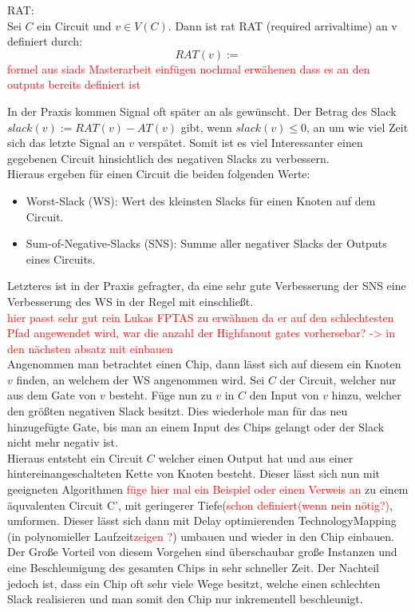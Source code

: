 \documentclass[11pt, a4paper, german]{article}
\newcommand{\TM}{TechnologyMapping }
\begin{document}
\begin{definition}{RAT:}\\
	Sei $C$ ein Circuit und $v \in V(C)$. Dann ist rat RAT (required arrivaltime) an v definiert durch:
	\[   RAT(v) :=  \] \textcolor{red}{formel aus siads Masterarbeit einfügen nochmal erwähenen dass es an den outputs bereits definiert ist}
\end{definition}

In der Praxis kommen Signal oft später an als gewünscht. Der Betrag des Slack $slack(v) := RAT(v) - AT(v)$ gibt, wenn $slack(v) \leq 0 $, an um wie viel Zeit sich das letzte Signal an $v$ verspätet. Somit ist es viel Interessanter einen gegebenen Circuit hinsichtlich des negativen Slacks zu verbessern. \\
Hieraus ergeben für einen Circuit die beiden folgenden Werte: 
\begin{itemize}
	\item Worst-Slack (WS): Wert des kleinsten Slacks für einen Knoten auf dem Circuit.
	\item Sum-of-Negative-Slacks (SNS): Summe aller negativer Slacks der Outputs eines Circuits.
\end{itemize}
Letzteres ist in der Praxis gefragter, da eine sehr gute Verbesserung der SNS eine Verbesserung des WS in der Regel mit einschließt. \\

\textcolor{red}{hier passt sehr gut rein Lukas FPTAS zu erwähnen da er auf den schlechtesten Pfad angewendet wird, war die anzahl der Highfanout gates vorhersebar? -> in den nächsten absatz mit einbauen}\\

Angenommen man betrachtet einen Chip, dann lässt sich auf diesem ein Knoten $v$ finden, an welchem der WS angenommen wird. Sei $C$ der Circuit, welcher nur aus dem Gate von $v$ besteht. Füge nun zu $v$ in $C$ den Input von $v$ hinzu, welcher den größten negativen Slack besitzt. Dies wiederhole man für das neu hinzugefügte Gate, bis man an einem Input des Chips gelangt oder der Slack nicht mehr negativ ist. \\
Hieraus entsteht ein Circuit $C$ welcher einen Output hat und aus einer hintereinangeschalteten Kette von Knoten besteht. Dieser lässt sich nun mit geeigneten Algorithmen \textcolor{red}{füge hier mal ein Beispiel oder einen Verweis an} zu einem äquvalenten Circuit C', mit geringerer Tiefe(\textcolor{red}{schon definiert(wenn nein nötig?)}, umformen. Dieser lässt sich dann mit  Delay optimierenden \TM (in polynomieller Laufzeit\textcolor{red}{zeigen ?}) umbauen und wieder in den Chip einbauen. Der Große Vorteil von diesem Vorgehen sind überschaubar große Instanzen und eine Beschleunigung des gesamten Chips in sehr schneller Zeit. Der Nachteil jedoch ist, dass ein Chip oft sehr viele Wege besitzt, welche einen schlechten Slack realisieren und man somit den Chip nur inkrementell beschleunigt.\\
\end{document}
